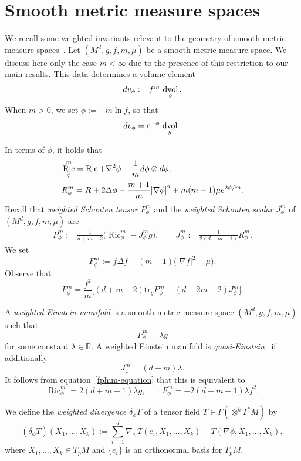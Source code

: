 \documentclass[11pt]{article}
\numberwithin{equation}{section}
\DeclareMathOperator{\dvol}{dvol}
\DeclareMathOperator{\Ric}{Ric}
\newcommand{\lv}{\lvert}
\newcommand{\rv}{\rvert}
\newcommand{\bR}{\mathbb{R}}
\numberwithin{equation}{section}
\begin{document}
\section{Smooth metric measure spaces}
\label{sec:bg.tex}

We recall some weighted invariants relevant to the geometry of smooth metric measure spaces~\cite{Case2014s}. Let $(M^d,g,f,m,\mu)$ be a smooth metric measure space. We discuss here only the case $m<\infty$ due to the presence of this restriction to our main results. This data determines a volume element
\[
{\rm d}v_\phi := f^m\,\dvol_g .
\]
When $m>0$, we set $\phi:=-m\ln f$, so that
\[
{\rm d}v_\phi = {\rm e}^{-\phi}\,\dvol_g .
\]


In terms of $\phi$, it holds that
\begin{align*}
&\Ric_\phi^m= \Ric + \nabla^2\phi - \frac{1}{m} {\rm d}\phi \otimes {\rm d}\phi,
\\
&R_\phi^m= R + 2\Delta\phi - \frac{m+1}{m}\lv\nabla\phi\rv^2 + m(m-1)\mu {\rm e}^{2\phi/m} .
\end{align*}
Recall that \emph{weighted Schouten tensor $P_\phi^m$} and the \emph{weighted Schouten scalar $J_\phi^m$} of $(M^d,g,f,m,\mu)$ are
\begin{gather*}
 P_\phi^m := \frac{1}{d+m-2}\big(\Ric_\phi^m - J_\phi^m g\big), \qquad
 J_\phi^m := \frac{1}{2(d+m-1)}R_\phi^m .
\end{gather*}
We set
\[
F_\phi^m:= f\Delta f+(m-1)\big(|\nabla f|^2-\mu\big).
\]
Observe that
\begin{equation}\label{fphim-equation}
F_\phi^m=\frac{f^2}{m}\bigl[(d+m-2)\mathrm{tr}_g P_\phi^m -(d+2m-2)J_\phi^m\bigr].
\end{equation}

A \emph{weighted Einstein manifold} is a smooth metric measure space $(M^d,g,f,m,\mu)$ such that
\[
P_\phi^m = \lambda g
\]
for some constant $\lambda\in\bR$.
A weighted Einstein manifold is \emph{quasi-Einstein}~\cite{Case_Shu_Wei} if additionally
\[
J_\phi^m=(d+m)\lambda.
\]
It follows from equation~\eqref{fphim-equation} that this is equivalent to
\[
\Ric_\phi^m=2(d+m-1)\lambda g,\qquad F_\phi^m=-2(d+m-1)\lambda f^2.
\]

We define the \emph{weighted divergence} $\delta_\phi T$ of a tensor field $T \in \Gamma(\otimes^k T^*M)$ by
\[
(\delta_\phi T)(X_1,\dots,X_k):=\sum\limits_{i=1}^d \nabla_{e_i} T(e_i,X_1,\dots,X_k)-T(\nabla\phi,X_1,\dots,X_k),
\]
where $X_1,\dots,X_k\in T_p M$ and $\{e_i\}$ is an orthonormal basis for $T_p M$.
\end{document}
